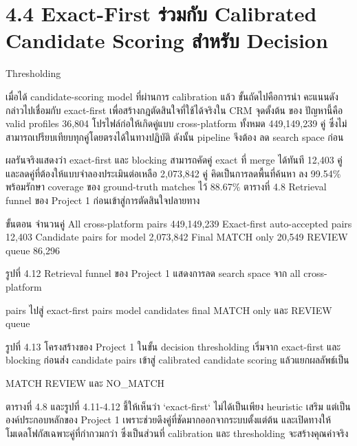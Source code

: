 \documentclass[12pt,a4paper]{report}
\begin{document}
\section*{4.4 Exact-First ร่วมกับ Calibrated Candidate Scoring สำหรับ Decision}
Thresholding\par
เมื่อได้ candidate-scoring model ที่ผ่านการ calibration แล้ว ขั้นถัดไปคือการนำ คะแนนดังกล่าวไปเชื่อมกับ exact-first เพื่อสร้างกฎตัดสินใจที่ใช้ได้จริงใน CRM จุดตั้งต้น ของ ปัญหานี้คือ valid profiles 36,804 โปรไฟล์ก่อให้เกิดคู่แบบ cross-platform ทั้งหมด 449,149,239 คู่ ซึ่งไม่สามารถเปรียบเทียบทุกคู่โดยตรงได้ในทางปฏิบัติ ดังนั้น pipeline จึงต้อง ลด search space ก่อน\par
ผลรันจริงแสดงว่า exact-first และ blocking สามารถคัดคู่ exact ที่ merge ได้ทันที 12,403 คู่ และลดคู่ที่ต้องให้แบบจำลองประเมินต่อเหลือ 2,073,842 คู่ คิดเป็นการลดพื้นที่ค้นหา ลง 99.54\% พร้อมรักษา coverage ของ ground-truth matches ไว้ 88.67\% ตารางที่ 4.8 Retrieval funnel ของ Project 1 ก่อนเข้าสู่การตัดสินใจปลายทาง\par
ขั้นตอน จำนวนคู่ All cross-platform pairs 449,149,239 Exact-first auto-accepted pairs 12,403 Candidate pairs for model 2,073,842 Final MATCH only 20,549 REVIEW queue 86,296\par
\begin{center}\small รูปที่ 4.12 Retrieval funnel ของ Project 1 แสดงการลด search space จาก all cross-platform\end{center}
pairs ไปสู่ exact-first pairs model candidates final MATCH only และ REVIEW queue\par
\clearpage
\begin{center}\small รูปที่ 4.13 โครงสร้างของ Project 1 ในขั้น decision thresholding เริ่มจาก exact-first และ blocking ก่อนส่ง candidate pairs เข้าสู่ calibrated candidate scoring แล้วแยกผลลัพธ์เป็น\end{center}
MATCH REVIEW และ NO\_MATCH\par
\begin{center}\small ตารางที่ 4.8 และรูปที่ 4.11-4.12 ชี้ให้เห็นว่า `exact-first` ไม่ได้เป็นเพียง heuristic เสริม แต่เป็นองค์ประกอบหลักของ Project 1 เพราะช่วยดึงคู่ที่ชัดมากออกจากระบบตั้งแต่ต้น และเปิดทางให้โมเดลโฟกัสเฉพาะคู่ที่กำกวมกว่า ซึ่งเป็นส่วนที่ calibration และ thresholding จะสร้างคุณค่าจริง\end{center}
\end{document}
